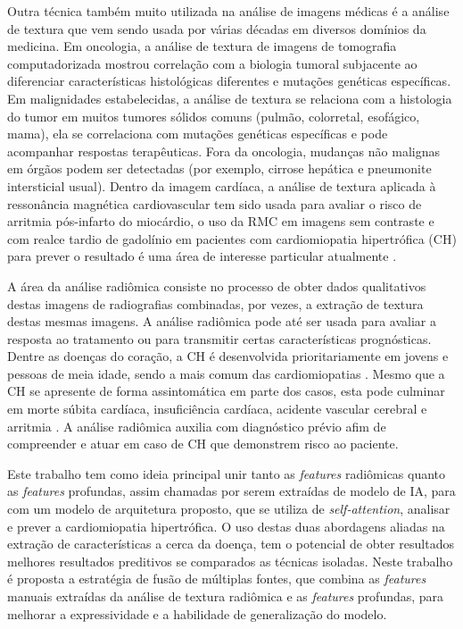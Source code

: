 Outra técnica também muito utilizada na análise de imagens médicas é a análise de textura que vem sendo usada por várias décadas em diversos domínios da medicina. Em oncologia, a análise de textura de imagens de tomografia computadorizada mostrou correlação com a biologia tumoral subjacente ao diferenciar características histológicas diferentes e mutações genéticas específicas. Em malignidades estabelecidas, a análise de textura se relaciona com a histologia do tumor em muitos tumores sólidos comuns (pulmão, colorretal, esofágico, mama), ela se correlaciona com mutações genéticas específicas e pode acompanhar respostas terapêuticas. Fora da oncologia, mudanças não malignas em órgãos podem ser detectadas (por exemplo, cirrose hepática e pneumonite intersticial usual). Dentro da imagem cardíaca, a análise de textura aplicada à ressonância magnética cardiovascular tem sido usada para avaliar o risco de arritmia pós-infarto do miocárdio, o uso da RMC em imagens sem contraste e com realce tardio de gadolínio em pacientes com cardiomiopatia hipertrófica (CH) para prever o resultado é uma área de interesse particular atualmente \cite{schofieldTextureAnalysisCardiovascular2019a}.

A área da análise radiômica consiste no processo de obter dados qualitativos destas imagens de radiografias combinadas, por vezes, a extração de textura destas mesmas imagens. A análise radiômica pode até ser usada para avaliar a resposta ao tratamento ou para transmitir certas características prognósticas. Dentre as doenças do coração, a \gls{CH} é desenvolvida prioritariamente em jovens e pessoas de meia idade, sendo a mais comum das cardiomiopatias . Mesmo que a \gls{CH} se apresente de forma assintomática em parte dos casos, esta pode culminar em morte súbita cardíaca, insuficiência cardíaca, acidente vascular cerebral e arritmia \cite{kwonComparisonMortalityCause2022}. A análise radiômica auxilia com diagnóstico prévio afim de compreender e atuar em caso de \gls{CH} que demonstrem risco ao paciente.


Este trabalho tem como ideia principal unir tanto as \textit{features} radiômicas quanto as \textit{features} profundas, assim chamadas por serem extraídas de modelo de \gls{IA}, para com um modelo de arquitetura proposto, que se utiliza de \textit{self-attention}, analisar e prever a cardiomiopatia hipertrófica. O uso destas duas abordagens aliadas na extração de características a cerca da doença, tem o potencial de obter resultados melhores resultados preditivos se comparados as técnicas isoladas. Neste trabalho é proposta a estratégia de fusão de múltiplas fontes, que combina as \textit{features} manuais extraídas da análise de textura radiômica e as \textit{features} profundas, para melhorar a expressividade e a habilidade de generalização do modelo.

